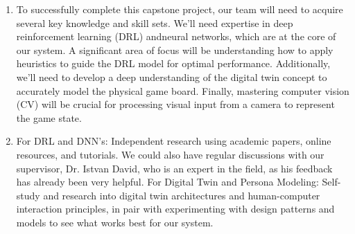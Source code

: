 \documentclass{article}
\begin{document}
\begin{enumerate}
    \item To successfully complete this capstone project, our team will need to acquire several key knowledge and skill sets.
    We'll need expertise in deep reinforcement learning (DRL) andneural networks, which are at the core of our system.
    A significant area of focus will be understanding how to apply heuristics to guide the DRL model for optimal performance.
    Additionally, we'll need to develop a deep understanding of the digital twin concept to accurately model the physical game board.
    Finally, mastering computer vision (CV) will be crucial for processing visual input from a camera to represent the game state.

    \item For DRL and DNN's: Independent research using academic papers, online resources, and tutorials.
    We could also have regular discussions with our supervisor, Dr. Istvan David, who is an expert in the field, as his feedback has already been very helpful.
    For Digital Twin and Persona Modeling: Self-study and research into digital twin architectures and human-computer interaction principles, in pair with experimenting with design patterns and models to see what works best for our system.

\end{enumerate}
\end{document}
